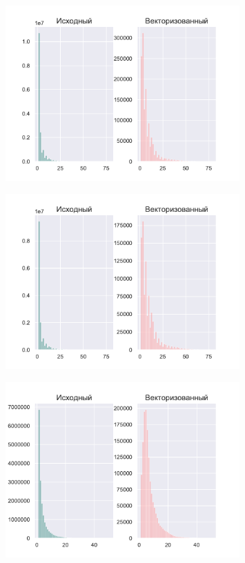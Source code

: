 \begin{figure}[ht]
	\centering
		\includegraphics[width=0.8\textwidth]{./pics/text_4_vec_irreg/shell_k_4.pdf}
	\caption{}
	\label{fig:text_4_vec_irreg_shell_k_4}
\end{figure}

\begin{figure}[ht]
	\centering
		\includegraphics[width=0.8\textwidth]{./pics/text_4_vec_irreg/shell_k_15.pdf}
	\caption{}
	\label{fig:text_4_vec_irreg_shell_k_15}
\end{figure}

\begin{figure}[ht]
	\centering
		\includegraphics[width=0.8\textwidth]{./pics/text_4_vec_irreg/hibbard_k_3.pdf}
	\caption{}
	\label{fig:text_4_vec_irreg_hibbard_k_3}
\end{figure}

